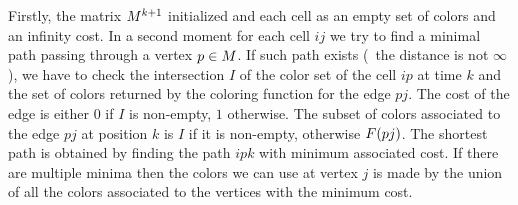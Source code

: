 Firstly, the matrix $M^{k+1}$ initialized and each cell as an empty set of colors and an infinity cost. In a second moment for each cell $ij$ we try to find a minimal path passing through a vertex $p \in M$. If such path exists (\ie\ the distance is not $\infty$), we have to check the intersection $I$ of the color set of the cell $ip$ at time $k$ and the set of colors returned by the coloring function for the edge $pj$. The cost of the edge is either $0$ if $I$ is non-empty, $1$ otherwise. The subset of colors associated to the edge $pj$ at position $k$ is $I$ if it is non-empty, otherwise $F(pj)$.
The shortest path is obtained by finding the path $ipk$ with minimum associated cost. If there are multiple minima then the colors we can use at vertex $j$ is made by the union of all the colors associated to the vertices with the minimum cost.

